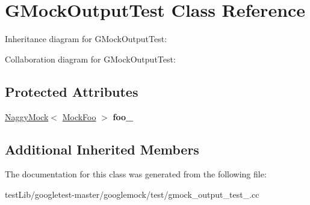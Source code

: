 \hypertarget{classGMockOutputTest}{}\section{G\+Mock\+Output\+Test Class Reference}
\label{classGMockOutputTest}


Inheritance diagram for G\+Mock\+Output\+Test\+:


Collaboration diagram for G\+Mock\+Output\+Test\+:
\subsection*{Protected Attributes}
\begin{DoxyCompactItemize}
\item 
\mbox{\label{classGMockOutputTest_aed97d2ca515d69466968c60575cc18a2}} 
\hyperlink{classtesting_1_1NaggyMock}{Naggy\+Mock}$<$ \hyperlink{classMockFoo}{Mock\+Foo} $>$ {\bfseries foo\+\_\+}
\end{DoxyCompactItemize}
\subsection*{Additional Inherited Members}


The documentation for this class was generated from the following file\+:\begin{DoxyCompactItemize}
\item 
test\+Lib/googletest-\/master/googlemock/test/gmock\+\_\+output\+\_\+test\+\_\+.\+cc\end{DoxyCompactItemize}
